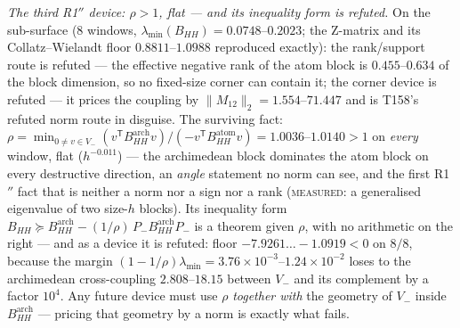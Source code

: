 \documentclass[11pt,a4paper]{article}
\begin{document}
\emph{The third R1$''$ device: $\rho>1$, flat --- and its inequality form is
refuted.} On the sub-surface ($8$ windows, $\lambda_{\min}(B_{HH})=0.0748$--$0.2023$;
the Z-matrix and its Collatz--Wielandt floor $0.8811$--$1.0988$ reproduced
exactly): the rank/support route is refuted --- the effective negative rank of the
atom block is $0.455$--$0.634$ of the block dimension, so no fixed-size corner can
contain it; the corner device is refuted --- it prices the coupling by
$\|M_{12}\|_2=1.554$--$71.447$ and is T158's refuted norm route in disguise. The
surviving fact: $\rho=\min_{0\ne v\in V_-}(v^{\mathsf T}B^{\mathrm{arch}}_{HH}v)/
(-v^{\mathsf T}B^{\mathrm{atom}}_{HH}v)=\mathbf{1.0036}$--$\mathbf{1.0140}>1$ on
\emph{every} window, flat ($h^{-0.011}$) --- the archimedean block dominates the
atom block on every destructive direction, an \emph{angle} statement no norm can
see, and the first R1$''$ fact that is neither a norm nor a sign nor a rank
(\textsc{measured}: a generalised eigenvalue of two size-$h$ blocks). Its
inequality form $B_{HH}\succeq B^{\mathrm{arch}}_{HH}-(1/\rho)\,P_-
B^{\mathrm{arch}}_{HH}P_-$ is a theorem given $\rho$, with no arithmetic on the
right --- and as a device it is refuted: floor $-7.9261\ldots-1.0919<0$ on $8/8$,
because the margin $(1-1/\rho)\lambda_{\min}=3.76\times10^{-3}$--$1.24\times
10^{-2}$ loses to the archimedean cross-coupling $2.808$--$18.15$ between $V_-$
and its complement by a factor $10^{4}$. Any future device must use $\rho$
\emph{together with} the geometry of $V_-$ inside $B^{\mathrm{arch}}_{HH}$ ---
pricing that geometry by a norm is exactly what fails.
\end{document}
